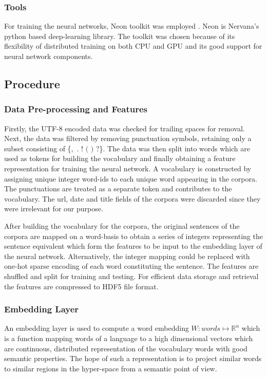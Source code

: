 \documentclass[12pt]{article}
\begin{document}
\subsubsection{Tools}
For training the neural networks, Neon toolkit was employed \cite{Neon}. Neon is Nervana's python based deep-learning library. The toolkit was chosen because of its flexibility of distributed training on both CPU and GPU and its good support for neural network components. 

\subsection{Procedure}\label{procedure}

\subsubsection{Data Pre-processing and Features}

Firstly, the UTF-8 encoded data was checked for trailing spaces for removal. Next, the data was filtered by removing punctuation symbols, retaining only a subset consisting of \{$,$ $.$ $!$ $($ $)$ $?$\}. The data was then split into words which are used as tokens for building the vocabulary and finally obtaining a feature representation for training the neural network. A vocabulary is constructed by assigning unique integer word-ids to each unique word appearing in the corpora. The punctuations are treated as a separate token and contributes to the vocabulary. The url, date and title fields of the corpora were discarded since they were irrelevant for our purpose.  

After building the vocabulary for the corpora, the original sentences of the corpora are mapped on a word-basis to obtain a series of integers representing the sentence equivalent which form the features to be input to the embedding layer of the neural network. Alternatively, the integer mapping could be replaced with one-hot sparse encoding of each word constituting the sentence. The features are shuffled and split for training and testing. For efficient data storage and retrieval the features are compressed to HDF5 file format.

\subsubsection{Embedding Layer}
An embedding layer is used to compute a word embedding $W: words \mapsto \mathbb{R}^{n}$ which is a function mapping words of a language to a high dimensional vectors which are continuous, distributed representation of the vocabulary words with good semantic properties. The hope of such a representation is to project similar words to similar regions in the hyper-space from a semantic point of view. 
\end{document}
